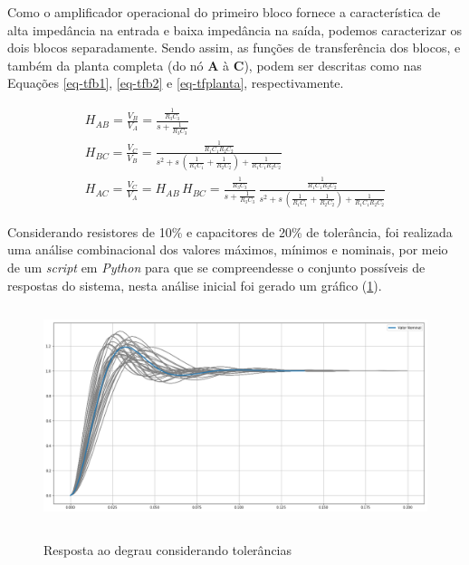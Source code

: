 \documentclass[
	12pt,				%
	article,			%
	openright,			%
	oneside,
	a4paper,			%
	chapter=TITLE,		%
	section=TITLE,		%
	english,			%
	french,				%
	spanish,			%
	brazil,				%
]{abntex2}
\begin{document}
        	Como o amplificador operacional do primeiro bloco fornece a característica de alta impedância na entrada e baixa impedância na saída, podemos caracterizar os dois blocos separadamente. Sendo assim, as funções de transferência dos blocos, e também da planta completa (do nó \textbf{A} à \textbf{C}), podem ser descritas como nas Equações \ref{eq-tfb1}, \ref{eq-tfb2} e \ref{eq-tfplanta}, respectivamente.
        	
        	\begin{eqnarray}
        		\label{eq-tfb1}
        		H_{AB} = \frac{V_B}{V_A} = \frac{\frac{1}{R_3C_3}}{s+\frac{1}{R_3C_3}} \\
        		\label{eq-tfb2}
        		H_{BC} = \frac{V_C}{V_B} = \frac{\frac{1}{R_1C_1R_2C_2}}{s^2 +s\,(\frac{1}{R_1C_1}+\frac{1}{R_2C_2}) + \frac{1}{R_1C_1R_2C_2}} \\
        		\label{eq-tfplanta}
        		H_{AC} = \frac{V_C}{V_A} = H_{AB}\,H_{BC} = \frac{\frac{1}{R_3C_3}}{s+\frac{1}{R_3C_3}}\,\frac{\frac{1}{R_1C_1R_2C_2}}{s^2 +s\,(\frac{1}{R_1C_1}+\frac{1}{R_2C_2}) + \frac{1}{R_1C_1R_2C_2}}
        	\end{eqnarray}
        	
        	Considerando resistores de 10\% e capacitores de 20\% de tolerância, foi realizada uma análise combinacional dos valores máximos, mínimos e nominais, por meio de um \textit{script} em \textit{Python} para que se compreendesse o conjunto possíveis de respostas do sistema, nesta análise inicial foi gerado um gráfico (\ref{fig-step-tolerancias}).
        	
        	\begin{figure}[htbp]
        		\centering
        		\caption{Resposta ao degrau considerando tolerâncias}
        		\includegraphics[width=\textwidth,height=240px,keepaspectratio]{tex/imgs/ftma/step-tolerancias.png}
        		\label{fig-step-tolerancias}
        	\end{figure}
        	
\end{document}
